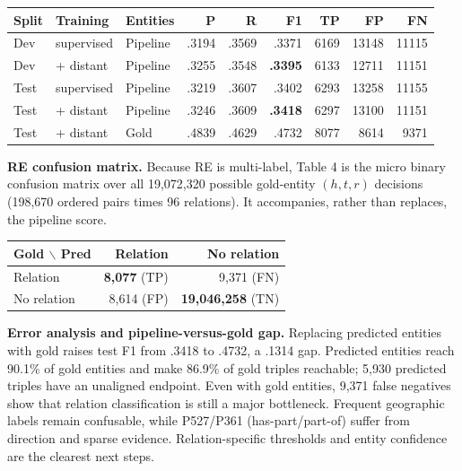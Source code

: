 \documentclass[10pt]{article}
\begin{document}
\begin{table}[H]\centering\scriptsize
\begin{tabular}{@{}lllrrrrrr@{}}\toprule
Split & Training & Entities & P & R & F1 & TP & FP & FN \\\midrule
Dev  & supervised & Pipeline & .3194 & .3569 & .3371 & 6169 & 13148 & 11115 \\
Dev  & + distant  & Pipeline & .3255 & .3548 & \textbf{.3395} & 6133 & 12711 & 11151 \\
Test & supervised & Pipeline & .3219 & .3607 & .3402 & 6293 & 13258 & 11155 \\
Test & + distant  & Pipeline & .3246 & .3609 & \textbf{.3418} & 6297 & 13100 & 11151 \\
Test & + distant  & Gold & .4839 & .4629 & .4732 & 8077 & 8614 & 9371 \\\bottomrule
\end{tabular}
\par{}
\end{table}\vspace{-0.6em}

\textbf{RE confusion matrix.}
Because RE is multi-label, Table 4 is the micro binary confusion matrix over
all 19,072,320 possible gold-entity $(h,t,r)$ decisions (198,670 ordered pairs
times 96 relations). It accompanies, rather than replaces, the pipeline score.
\begin{table}[H]\centering\scriptsize
\begin{tabular}{@{}lrr@{}}\toprule
Gold $\backslash$ Pred & Relation & No relation \\\midrule
Relation & \textbf{8,077} (TP) & 9,371 (FN) \\
No relation & 8,614 (FP) & \textbf{19,046,258} (TN) \\\bottomrule
\end{tabular}
\par{}
\end{table}\vspace{-0.55em}

\textbf{Error analysis and pipeline-versus-gold gap.}
Replacing predicted entities with gold raises test F1 from .3418 to .4732, a
.1314 gap. Predicted entities reach 90.1\% of gold entities and make 86.9\%
of gold triples reachable; 5,930 predicted triples have an unaligned endpoint.
Even with gold entities, 9,371 false negatives show that relation classification
is still a major bottleneck. Frequent geographic labels remain confusable,
while P527/P361 (has-part/part-of) suffer from direction and sparse evidence.
Relation-specific thresholds and entity confidence are the clearest next steps.
\end{document}
